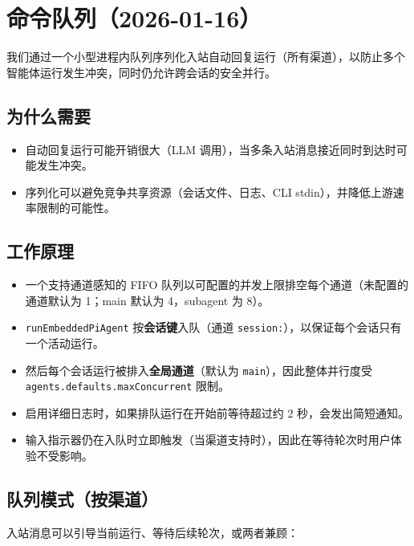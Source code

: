 \clearpage

\section{命令队列（2026-01-16）}


我们通过一个小型进程内队列序列化入站自动回复运行（所有渠道），以防止多个智能体运行发生冲突，同时仍允许跨会话的安全并行。

\subsection{为什么需要}


\begin{itemize}
  \item 自动回复运行可能开销很大（LLM 调用），当多条入站消息接近同时到达时可能发生冲突。
  \item 序列化可以避免竞争共享资源（会话文件、日志、CLI stdin），并降低上游速率限制的可能性。
\end{itemize}


\subsection{工作原理}


\begin{itemize}
  \item 一个支持通道感知的 FIFO 队列以可配置的并发上限排空每个通道（未配置的通道默认为 1；main 默认为 4，subagent 为 8）。
  \item \texttt{runEmbeddedPiAgent} 按\textbf{会话键}入队（通道 \texttt{session:}），以保证每个会话只有一个活动运行。
  \item 然后每个会话运行被排入\textbf{全局通道}（默认为 \texttt{main}），因此整体并行度受 \texttt{agents.defaults.maxConcurrent} 限制。
  \item 启用详细日志时，如果排队运行在开始前等待超过约 2 秒，会发出简短通知。
  \item 输入指示器仍在入队时立即触发（当渠道支持时），因此在等待轮次时用户体验不受影响。
\end{itemize}


\subsection{队列模式（按渠道）}


入站消息可以引导当前运行、等待后续轮次，或两者兼顾：

